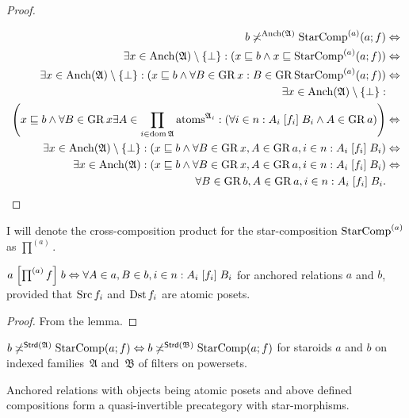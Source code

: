 \begin{proof}
~

\begin{align*}
b\not\asymp^{\operatorname{Anch}(\mathfrak{A})}\operatorname{StarComp}^{(a)}(a;f) & \Leftrightarrow\\
\exists x\in\operatorname{Anch}(\mathfrak{A})\setminus\{\bot\}:(x\sqsubseteq b\wedge x\sqsubseteq\operatorname{StarComp}^{(a)}(a;f)) & \Leftrightarrow\\
\exists x\in\operatorname{Anch}(\mathfrak{A})\setminus\{\bot\}:(x\sqsubseteq b\wedge\forall B\in\operatorname{GR} x:B\in\operatorname{GR}\operatorname{StarComp}^{(a)}(a;f)) & \Leftrightarrow\\
\exists x\in\operatorname{Anch}(\mathfrak{A})\setminus\{\bot\}:\\
\left(x\sqsubseteq b\wedge\forall B\in\operatorname{GR} x\exists A\in\prod_{i\in\operatorname{dom}\mathfrak{A}}\operatorname{atoms}^{\mathfrak{A}_{i}}:\left(\forall i\in n:A_{i}\mathrel{\left[f_{i}\right]}B_{i}\wedge A\in\operatorname{GR} a\right)\right) & \Leftrightarrow\\
\exists x\in\operatorname{Anch}(\mathfrak{A})\setminus\{\bot\}:\left(x\sqsubseteq b\wedge\forall B\in\operatorname{GR} x,A\in\operatorname{GR} a,i\in n:A_{i}\mathrel{\left[f_{i}\right]}B_{i}\right) & \Leftrightarrow\\
\exists x\in\operatorname{Anch}(\mathfrak{A}):\left(x\sqsubseteq b\wedge\forall B\in\operatorname{GR} x,A\in\operatorname{GR} a,i\in n:A_{i}\mathrel{\left[f_{i}\right]}B_{i}\right) & \Leftrightarrow\\
\forall B\in\operatorname{GR} b,A\in\operatorname{GR} a,i\in n:A_{i}\mathrel{\left[f_{i}\right]}B_{i}.
\end{align*}
\end{proof}
\begin{defn}
I will denote the cross-composition product for the star-composition
$\operatorname{StarComp}^{(a)}$ as $\prod^{(a)}$.\end{defn}
\begin{thm}
\label{a-b-cross-prod}$a\mathrel{\left[\prod^{(a)}f\right]}b\Leftrightarrow\forall A\in a,B\in b,i\in n:A_{i}\mathrel{\left[f_{i}\right]}B_{i}$
for anchored relations $a$ and $b$, provided that $\operatorname{Src} f_{i}$
and $\operatorname{Dst} f_{i}$ are atomic posets.\end{thm}
\begin{proof}
From the lemma.\end{proof}
\begin{conjecture}
$b\not\asymp^{\mathsf{Strd}(\mathfrak{A})}\operatorname{StarComp}(a;f)\Leftrightarrow b\not\asymp^{\mathsf{Strd}(\mathfrak{B})}\operatorname{StarComp}(a;f)$
for staroids $a$ and $b$ on indexed families~$\mathfrak{A}$ and~$\mathfrak{B}$
of filters on powersets.\end{conjecture}
\begin{thm}
Anchored relations with objects being atomic posets and above defined
compositions form a quasi-invertible precategory with star-morphisms.\end{thm}
